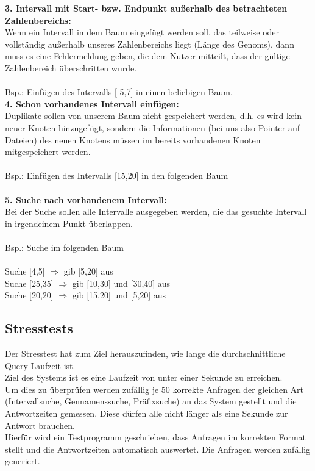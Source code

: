 \textbf{3. Intervall mit Start- bzw. Endpunkt außerhalb des betrachteten Zahlenbereichs:}\\
Wenn ein Intervall in dem Baum eingefügt werden soll, das teilweise oder vollständig außerhalb unseres Zahlenbereichs liegt (Länge des Genoms), dann muss es eine Fehlermeldung geben, die dem Nutzer mitteilt, dass der gültige Zahlenbereich überschritten wurde.\\\\
Bsp.: Einfügen des Intervalls [-5,7] in einen beliebigen Baum.\newpage\hfill\\
\textbf{4. Schon vorhandenes Intervall einfügen:}\\
Duplikate sollen von unserem Baum nicht gespeichert werden, d.h. es wird kein neuer Knoten hinzugefügt, sondern die Informationen (bei uns also Pointer auf Dateien) des neuen Knotens müssen im bereits vorhandenen Knoten mitgespeichert werden.\\\\
Bsp.: Einfügen des Intervalls [15,20] in den folgenden Baum\\\\
\textbf{5. Suche nach vorhandenem Intervall:}\\
Bei der Suche sollen alle Intervalle ausgegeben werden, die das gesuchte Intervall in irgendeinem Punkt überlappen.\\\\
Bsp.: Suche im folgenden Baum\\\\
Suche [4,5] $\Rightarrow$ gib [5,20] aus\\
Suche [25,35] $\Rightarrow$ gib [10,30] und [30,40] aus\\
Suche [20,20] $\Rightarrow$ gib [15,20] und [5,20] aus
\subsection{Stresstests}
Der Stresstest hat zum Ziel herauszufinden, wie lange die durchschnittliche Query-Laufzeit ist.\\
Ziel des Systems ist es eine Laufzeit von unter einer Sekunde zu erreichen.\\
Um dies zu überprüfen werden zufällig je 50 korrekte Anfragen der gleichen Art (Intervallsuche, Gennamenssuche, Präfixsuche) an das System gestellt und die Antwortzeiten gemessen. Diese dürfen alle nicht länger als eine Sekunde zur Antwort brauchen.\\
Hierfür wird ein Testprogramm geschrieben, dass Anfragen im korrekten Format stellt und die Antwortzeiten automatisch auswertet. Die Anfragen werden zufällig generiert.

